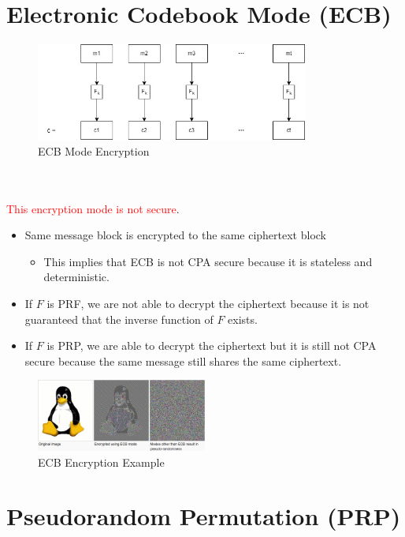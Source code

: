 \documentclass{scribe}
\begin{document}
\section{Electronic Codebook Mode (ECB)}
\begin{figure}[h]
  \centering
  \includegraphics[width=0.8\textwidth]{ecb.jpg}
  \caption{ECB Mode Encryption}
\end{figure}
\\
\\ \textcolor{red}{This encryption mode is not secure}.
\begin{itemize}
    \item Same message block is encrypted to the same ciphertext block
    \begin{itemize}
    \item This implies that ECB is not CPA secure because it is stateless and deterministic.
    \end{itemize}
    \item If $F$ is PRF, we are not able to decrypt the ciphertext because it is not guaranteed that the inverse function of $F$ exists.
    \item If $F$ is PRP, we are able to decrypt the ciphertext but it is still not CPA secure because the same message still shares the same ciphertext.
\end{itemize}
\begin{figure}[h!]
  \centering
  \includegraphics[width=0.5\textwidth]{figure4.png}
  \caption{ECB Encryption Example}
\end{figure}



\section{Pseudorandom Permutation (PRP)}
\end{document}
